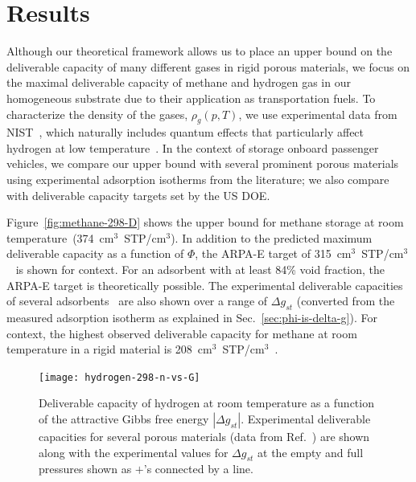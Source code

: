 \documentclass[twoside,twocolumn,9pt]{article}
\newcommand\V{\Phi}
\newcommand\gst{\ensuremath{\Delta g_{st}}}
\begin{document}
\section{Results}
Although our theoretical framework allows us to place an upper bound on the
deliverable capacity of many different gases in rigid porous materials, we
focus on the maximal deliverable capacity of methane and hydrogen gas in our
homogeneous substrate due to their application as transportation fuels. To
characterize the density of the gases, $\rho_g(p, T)$, we use experimental data
from NIST~\cite{nist}, which naturally includes quantum effects that
particularly affect hydrogen at low temperature~\cite{kumar2006quantum}. In the
context of storage onboard passenger vehicles, we compare our upper bound with
several prominent porous materials using experimental adsorption isotherms from
the literature; we also compare with deliverable capacity targets set by the US
DOE.

Figure~\ref{fig:methane-298-D} shows the upper bound for methane storage at
room temperature~(374~cm$^3$~STP/cm$^3$). In addition to the predicted maximum
deliverable capacity as a function of $\V$, the ARPA-E target of
315~cm$^3$~STP/cm$^3$~\cite{arpaemove} is shown for context. For an adsorbent
with at least 84\% void fraction, the ARPA-E target is theoretically possible.
The experimental deliverable capacities of several
adsorbents~\cite{mason2014evaluating} are also shown over a range of $\gst$
(converted from the measured adsorption isotherm as explained in
Sec.~\ref{sec:phi-is-delta-g}). For context, the highest observed
deliverable capacity for methane at room temperature in a rigid material is 208~cm$^3$~STP/cm$^3$~\cite{simon2015materials}.

\begin{figure}
    \centering
    \texttt{[image: hydrogen-298-n-vs-G]}
    \caption{Deliverable capacity of hydrogen at room temperature as a function of the attractive Gibbs free energy $|\gst|$.  Experimental deliverable capacities for several porous materials (data from Ref.~\cite{mason2014evaluating, garcia2018benchmark}) are shown along with the experimental values for $\gst$ at the empty and full pressures shown as $+$'s connected by a line.}
    \label{fig:hydrogen-298-D}
\end{figure}
\end{document}

